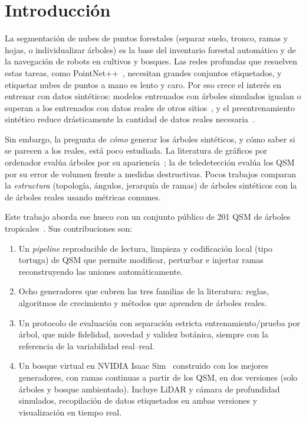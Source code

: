 \documentclass[11pt,a4paper]{article}
\begin{document}
\section{Introducción}

La segmentación de nubes de puntos forestales (separar suelo, tronco, ramas y hojas, o individualizar árboles) es la base del inventario forestal automático y de la navegación de robots en cultivos y bosques. Las redes profundas que resuelven estas tareas, como PointNet++~\cite{qi2017pointnetpp}, necesitan grandes conjuntos etiquetados, y etiquetar nubes de puntos a mano es lento y caro. Por eso crece el interés en entrenar con datos sintéticos: modelos entrenados con árboles simulados igualan o superan a los entrenados con datos reales de otros sitios~\cite{bryson2023synthetic,bryson2024domain}, y el preentrenamiento sintético reduce drásticamente la cantidad de datos reales necesaria~\cite{she2026scaling}.

Sin embargo, la pregunta de \emph{cómo} generar los árboles sintéticos, y cómo saber si se parecen a los reales, está poco estudiada. La literatura de gráficos por ordenador evalúa árboles por su apariencia~\cite{polasek2021ictree,zhou2023deeptree}; la de teledetección evalúa los QSM por su error de volumen frente a medidas destructivas. Pocos trabajos comparan la \emph{estructura} (topología, ángulos, jerarquía de ramas) de árboles sintéticos con la de árboles reales usando métricas comunes.

Este trabajo aborda ese hueco con un conjunto público de 201 QSM de árboles tropicales~\cite{krishnamoorthy2022data}. Sus contribuciones son:
\begin{enumerate}
  \item Un \emph{pipeline} reproducible de lectura, limpieza y codificación local (tipo tortuga) de QSM que permite modificar, perturbar e injertar ramas reconstruyendo las uniones automáticamente.
  \item Ocho generadores que cubren las tres familias de la literatura: reglas, algoritmos de crecimiento y métodos que aprenden de árboles reales.
  \item Un protocolo de evaluación con separación estricta entrenamiento/prueba por árbol, que mide fidelidad, novedad y validez botánica, siempre con la referencia de la variabilidad real--real.
  \item Un bosque virtual en NVIDIA Isaac Sim~\cite{isaacsim} construido con los mejores generadores, con ramas continuas a partir de los QSM, en dos versiones (solo árboles y bosque ambientado). Incluye LiDAR y cámara de profundidad simulados, recopilación de datos etiquetados en ambas versiones y visualización en tiempo real.
\end{enumerate}
\end{document}

